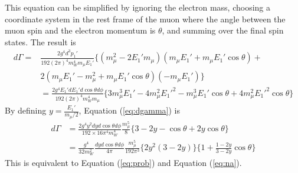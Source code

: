 \documentclass{outhesis}
\begin{document}
This equation can be simplified by ignoring the electron mass, choosing a coordinate system in the rest frame of the muon where the angle between the muon spin and the electron momentum is $\theta$, and summing over the final spin states. The result is
 \begin{equation}
\label{eq:dgamma}
\begin{split}
d\Gamma= &\frac{2g^4d^3p_1'}{192\left(2\pi\right)^4 m_W^4 m_\mu E_1'}
\{\left(m_\mu^2-2E_1'm_\mu \right)\left(m_\mu E_1'+m_\mu E_1'\cos \theta \right) +\\
&2\left(m_\mu E_1'-m_\mu^2 + m_\mu E_1'\cos \theta \right)(-m_\mu E_1')\}\\
& = \frac{2g^4E_1'dE_1'd\cos \theta d\phi}{192\left(2\pi\right)^4 m_W^4 m_\mu}\{3m_\mu^3E_1' - 4m_\mu^2 E_1'^2 - m_\mu^3 E_1' \cos \theta +4 m_\mu^2 E_1'^2 \cos \theta \}
\end{split}
\end{equation}
By defining $y = \frac{E_1'}{m_\mu /2}$, Equation (\ref{eq:dgamma}) is
 \begin{equation}
\label{eq:dgamma_f}
\begin{split}
d\Gamma & = \frac{2g^4y^2 dy d\cos \theta d\phi}{192\times 16 \pi^4 m_W^4}\frac{m_\mu^5}{8}
\{3-2y-\cos \theta + 2y \cos \theta\}\\
& = \frac{g^4}{32m_W^2} \frac{ dy d\cos \theta d\phi}{4 \pi} \frac{m_\mu^5}{192 \pi^3}
\{2y^2 \left(3-2y\right)\}\{1+\frac{1-2y}{3-2y}\cos \theta \}
\end{split}
\end{equation}
 This is equivalent to Equation (\ref{eq:prob}) and Equation (\ref{eq:na}).
 
\end{document}

